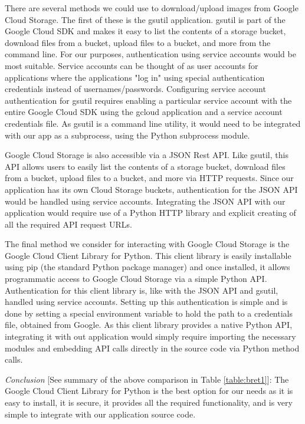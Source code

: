 \documentclass[10pt, onecolumn, draftclsnofoot, letterpaper, compsoc]{IEEEtran}
\begin{document}
There are several methods we could use to download/upload images from Google Cloud
Storage. The first of these is the gsutil application. gsutil is part of the Google
Cloud SDK and makes it easy to list the contents of a storage bucket, download files
from a bucket, upload files to a bucket, and more from the command 
line\cite{gsutil, cloudStorage}. For our purposes, authentication using
service accounts would be most suitable. Service accounts can be
thought of as user accounts for applications where the applications "log in"
using special authentication credentials instead of usernames/passwords. Configuring
service account authentication for gsutil requires enabling a particular service
account with the entire Google Cloud SDK using the gcloud application and a service
account credentials file. As gsutil is a command line utility, it would need to be
integrated with our app as a subprocess, using the Python subprocess module.

Google Cloud Storage is also accessible via a JSON Rest API. Like gsutil, this API 
allows users to easily list the contents of a storage bucket, download files from 
a bucket, upload files to a bucket, and more via HTTP requests\cite{cloudStorageJSON}.
Since our application has its own Cloud Storage buckets, authentication for the
JSON API would be handled using service accounts\cite{cloudStorageJSON}. Integrating 
the JSON API with our application would require use of a Python HTTP library and explicit creating
of all the required API request URLs\cite{cloudStorageJSON}.

The final method we consider for interacting with Google Cloud Storage is the
Google Cloud Client Library for Python. This client library is easily
installable using pip (the standard Python package manager) and once installed,
it allows programmatic access to Google Cloud Storage via a simple Python
API\cite{cloudStorageLib}. Authentication for this client library is, like with 
the JSON API and gsutil, handled using service accounts\cite{cloudStorageLib}. 
Setting up this authentication is simple and is done by setting a special 
environment variable to hold the path to a credentials file, obtained from 
Google\cite{cloudStorageLib}. As this client library provides a native Python 
API, integrating it with out application would simply require importing the 
necessary modules and embedding API calls directly in the source code via 
Python method calls\cite{cloudStorageLib}.

\textit{Conclusion} [See summary of the above comparison in Table \ref{table:bret1}]:
The Google Cloud Client Library for Python is the best
option for our needs as it is easy to install, it is secure, it provides all the
required functionality, and is very simple to integrate with our application 
source code.
\end{document}
